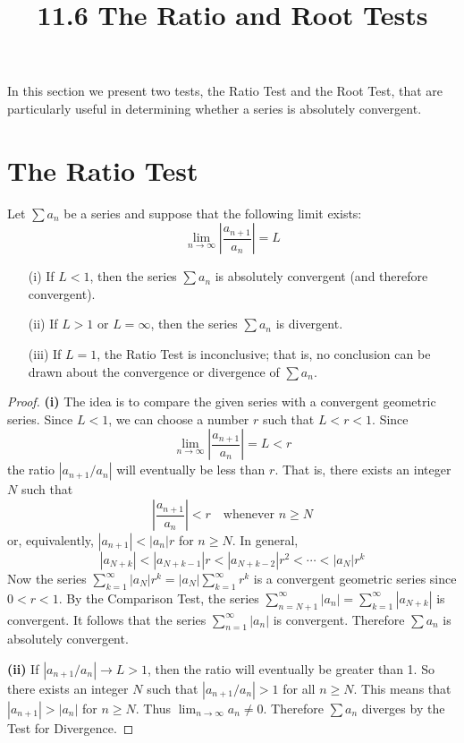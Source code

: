 \documentclass{article}
\title{11.6 The Ratio and Root Tests}
\date{}
\author{}
\theoremstyle{mystyle}
\begin{document}
\maketitle

In this section we present two tests, the Ratio Test and the Root Test, that are particularly useful in determining whether a series is absolutely convergent.

\section*{The Ratio Test}

\begin{tcolorbox}[
    colback=white,
    colframe=orange!80!white,
    title=The Ratio Test,
    boxrule=0.5mm,
    arc=3mm
    ]
    Let \( \sum a_n \) be a series and suppose that the following limit exists:
    \[ \lim_{n\to\infty} \left| \dfrac{a_{n+1}}{a_n} \right| = L \]
    \begin{itemize}
        \item[(i)] If \(L < 1\), then the series \( \sum a_n \) is absolutely convergent (and therefore convergent).
        \item[(ii)] If \(L > 1\) or \(L = \infty\), then the series \( \sum a_n \) is divergent.
        \item[(iii)] If \(L = 1\), the Ratio Test is inconclusive; that is, no conclusion can be drawn about the convergence or divergence of \( \sum a_n \).
    \end{itemize}
\end{tcolorbox}

\begin{proof}
\textbf{(i)} The idea is to compare the given series with a convergent geometric series. Since \(L < 1\), we can choose a number \(r\) such that \(L < r < 1\). Since
\[ \lim_{n\to\infty} \left| \dfrac{a_{n+1}}{a_n} \right| = L < r \]
the ratio \( |a_{n+1}/a_n| \) will eventually be less than \(r\). That is, there exists an integer \(N\) such that
\[ \left| \dfrac{a_{n+1}}{a_n} \right| < r \quad \text{whenever } n \ge N \]
or, equivalently, \( |a_{n+1}| < |a_n|r \) for \(n \ge N\). In general,
\[ |a_{N+k}| < |a_{N+k-1}|r < |a_{N+k-2}|r^2 < \cdots < |a_N|r^k \]
Now the series \( \sum_{k=1}^{\infty} |a_N|r^k = |a_N| \sum_{k=1}^{\infty} r^k \) is a convergent geometric series since \(0 < r < 1\). By the Comparison Test, the series \( \sum_{n=N+1}^{\infty} |a_n| = \sum_{k=1}^{\infty} |a_{N+k}| \) is convergent. It follows that the series \( \sum_{n=1}^{\infty} |a_n| \) is convergent. Therefore \( \sum a_n \) is absolutely convergent.

\textbf{(ii)} If \( |a_{n+1}/a_n| \to L > 1 \), then the ratio will eventually be greater than 1. So there exists an integer \(N\) such that \( |a_{n+1}/a_n| > 1 \) for all \(n \ge N\). This means that \(|a_{n+1}| > |a_n|\) for \(n \ge N\). Thus \( \lim_{n\to\infty} a_n \neq 0 \). Therefore \( \sum a_n \) diverges by the Test for Divergence.
\end{proof}
\end{document}
